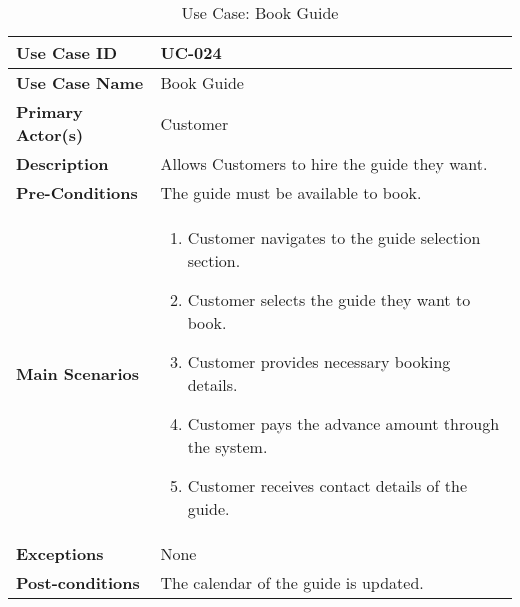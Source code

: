 \begin{table}[ht]
    \centering
    \begin{tabular}{|l|p{}|}
        \hline
        \textbf{Use Case ID} & UC-024 \\
        \hline
        \textbf{Use Case Name} & Book Guide \\
        \hline
        \textbf{Primary Actor(s)} & Customer \\
        \hline
        \textbf{Description} & Allows Customers to hire the guide they want. \\
        \hline
        \textbf{Pre-Conditions} & The guide must be available to book. \\
        \hline
        \textbf{Main Scenarios} & 
        \begin{enumerate}[label=\arabic*.,itemsep=0pt]
            \item Customer navigates to the guide selection section.
            \item Customer selects the guide they want to book.
            \item Customer provides necessary booking details.
            \item Customer pays the advance amount through the system.
            \item Customer receives contact details of the guide.
        \end{enumerate} \\
        \hline
        \textbf{Exceptions} & None \\
        \hline
        \textbf{Post-conditions} & The calendar of the guide is updated. \\
        \hline
    \end{tabular}
    \label{tab:use-case-book-guide}
    \caption{Use Case: Book Guide}
\end{table}


